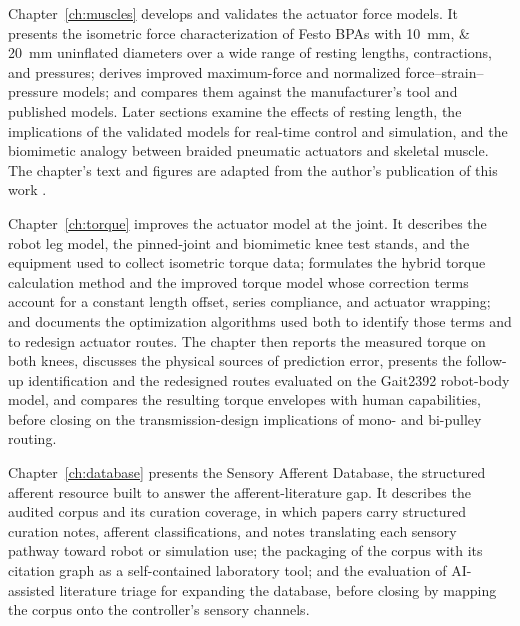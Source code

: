 Chapter~\ref{ch:muscles} develops and validates the actuator force models. It presents the isometric force characterization of Festo BPAs with \qtylist{10;20}{\mm} uninflated diameters over a wide range of resting lengths, contractions, and pressures; derives improved maximum-force and normalized force--strain--pressure models; and compares them against the manufacturer's tool and published models. Later sections examine the effects of resting length, the implications of the validated models for real-time control and simulation, and the biomimetic analogy between braided pneumatic actuators and skeletal muscle. The chapter's text and figures are adapted from the author's publication of this work \citep{bolen_2026}.

Chapter~\ref{ch:torque} improves the actuator model at the joint. It describes the robot leg model, the pinned-joint and biomimetic knee test stands, and the equipment used to collect isometric torque data; formulates the hybrid torque calculation method and the improved torque model whose correction terms account for a constant length offset, series compliance, and actuator wrapping; and documents the optimization algorithms used both to identify those terms and to redesign actuator routes. The chapter then reports the measured torque on both knees, discusses the physical sources of prediction error, presents the follow-up identification and the redesigned routes evaluated on the Gait2392 robot-body model, and compares the resulting torque envelopes with human capabilities, before closing on the transmission-design implications of mono- and bi-pulley routing.

Chapter~\ref{ch:database} presents the Sensory Afferent Database, the structured afferent resource built to answer the afferent-literature gap. It describes the audited corpus and its curation coverage, in which papers carry structured curation notes, afferent classifications, and notes translating each sensory pathway toward robot or simulation use; the packaging of the corpus with its citation graph as a self-contained laboratory tool; and the evaluation of AI-assisted literature triage for expanding the database, before closing by mapping the corpus onto the controller's sensory channels.

